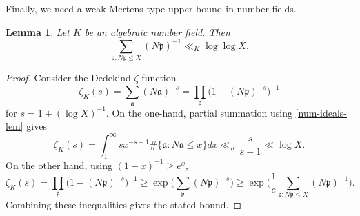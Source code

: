 \documentclass[11pt,reqno]{amsart}
\numberwithin{equation}{section}
\newtheorem{lemma}[theorem]{Lemma}
\theoremstyle{definition}
\theoremstyle{remark}
\newcommand{\mf}{\mathfrak}
\renewcommand{\le}{\leqslant}
\renewcommand{\ge}{\geqslant}
\begin{document}
Finally, we need a weak Mertens-type upper bound in number fields.
\begin{lemma}\label{number-field-mertens}
Let $K$ be an algebraic number field. Then 
\[ \sum_{\mf{p} : N\mf{p} \le X} (N\mf{p})^{-1} \ll_K \log \log X .\]
\end{lemma}
\begin{proof}
Consider the Dedekind $\zeta$-function 
\[ \zeta_K(s) = \sum_{\mf{a}} (N\mf{a})^{-s} = \prod_{\mf{p}} \big(1 - (N\mf{p})^{-s}\big)^{-1}\] for $s = 1 + (\log X)^{-1}$. On the one-hand, partial summation using \cref{num-ideals-lem} gives
\[ \zeta_K(s) = \int^{\infty}_1 s x^{-s-1} \# \{\mf{a} : N \mf{a} \le x\} dx \ll_K \frac{s}{s-1} \ll \log X. \] On the other hand, using $(1 - x)^{-1} \ge e^{x}$,
\[ \zeta_K(s) = \prod_{\mf{p}} \big(1 - (N\mf{p})^{-s}\big)^{-1}\ge \exp \big(\sum_{\mf{p}} (N\mf{p})^{-s}\big) \ge \exp \Big(\frac{1}{e}\sum_{\mf{p} : N\mf{p} \le X} (N \mf{p})^{-1}\Big).\]
Combining these inequalities gives the stated bound.
\end{proof}



\end{document}
